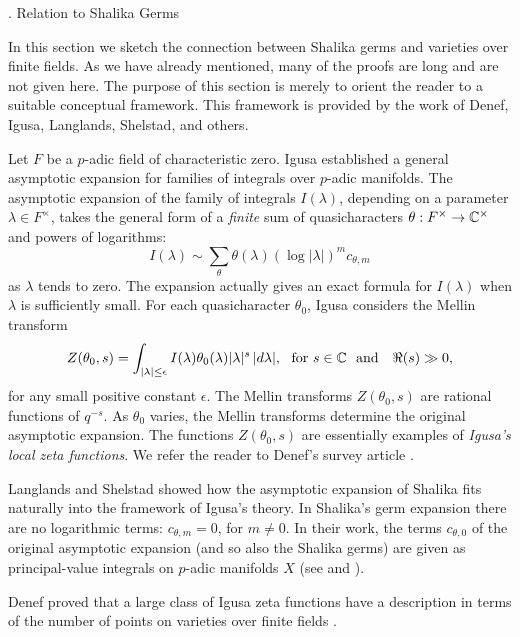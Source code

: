 . Relation to Shalika Germs\endhead

In this section we sketch the connection between Shalika germs and
varieties over finite fields.  As we have already mentioned, many of the
proofs are long and are not given here.  The purpose of this section
is merely to orient the reader to a suitable
conceptual framework.  This
framework is provided by the work of Denef,
Igusa, Langlands, Shelstad, and others.

Let $F$ be a $p$-adic field of characteristic zero.  Igusa \cite{I}
established
a general
asymptotic expansion for
families of  integrals over $p$-adic
manifolds.
The asymptotic expansion of the family of integrals $I(\lambda)$,
depending on a parameter $\lambda\in F^\times$,
takes  the general
form of a {\it finite} sum of quasicharacters 
$\theta:F^\times\to {\Bbb C}^\times$ and powers of logarithms:
$$I(\lambda) \sim \sum_\theta \theta(\lambda) (\log|\lambda|)^m
c_{\theta,m}$$
as $\lambda$ tends to zero.
The expansion actually gives an exact formula for $I(\lambda)$
when $\lambda$ is  sufficiently small.
For each quasicharacter
$\theta_0$, Igusa considers
the Mellin transform 
$$Z(\theta_0,s)= 
     \int_{|\lambda|\le \epsilon} I(\lambda) \theta_0(\lambda)|\lambda|^s 
    \,|d\lambda|,\ \ \hbox{for } s\in{\Bbb C}\ \ \hbox{and}\quad  \Re(s)\gg 0,$$
for any small positive constant $\epsilon$.
The Mellin transforms $Z(\theta_0,s)$ are rational functions of 
$q^{-s}$.  As $\theta_0$ varies, the Mellin transforms determine
the original asymptotic expansion.
The functions $Z(\theta_0,s)$ are essentially
examples of {\it Igusa's  
local zeta functions}.
We refer the reader to Denef's survey article \cite{D2}.

Langlands and Shelstad
showed  how the asymptotic expansion of Shalika 
fits naturally into
the framework of Igusa's theory.  In Shalika's germ
expansion there are no logarithmic terms: $c_{\theta,m}=0$,
for $m\ne0$. In their work,
the terms $c_{\theta,0}$ of the
original asymptotic expansion (and so also the Shalika germs)
are given as principal-value integrals
on $p$-adic manifolds $X$ (see \cite{L} and \cite{H3}).

Denef proved that a large class of Igusa zeta functions have
a description in terms of the number of points on varieties over
finite fields \cite{D1}.


